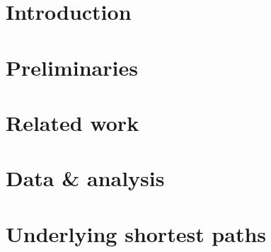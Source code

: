 \documentclass[a4paper]{article}
\numberwithin{algorithm}{section}
\numberwithin{figure}{section}
\numberwithin{table}{section}
\numberwithin{equation}{section}
\begin{document}
    \pagebreak

    \pagestyle{plain}
    \setcounter{page}{1}
    \setlength{\parindent}{40pt}

    \section{Introduction}
    \label{sec:intro}
    
    \pagebreak
   
    \section{Preliminaries}
    \label{sec:prel}
    
    \pagebreak
    
    \section{Related work}
    \label{sec:relwrk}
    
    \pagebreak
    
    \section{Data \& analysis}
    \label{sec:data}
    
    \pagebreak
    
    \section{Underlying shortest paths}
    \label{sec:usp}
    
    \pagebreak
    
\end{document}
